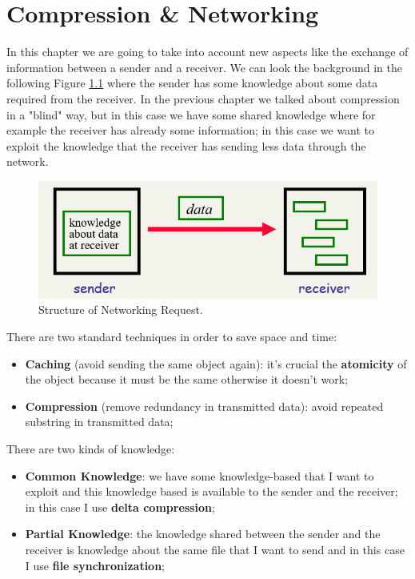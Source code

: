 \chapter{Compression \& Networking}
In this chapter we are going to take into account new aspects like the exchange of information between a sender and a receiver.\newline
We can look the background in the following Figure \ref{fig:networkingrequest} where the sender has some knowledge about some data required from the receiver. In the previous chapter we talked about compression in a "blind" way, but in this case we have some shared knowledge where for example the receiver has already some information; in this case we want to exploit the knowledge that the receiver has sending less data through the network.\newline
\begin{figure}
    \centering
    \includegraphics[width=0.75\linewidth]{images/networking.PNG}
    \caption{Structure of Networking Request.}
    \label{fig:networkingrequest}
\end{figure}
There are two standard techniques in order to save space and time:
\begin{itemize}
    \item \textbf{Caching} (avoid sending the same object again): it's crucial the \textbf{atomicity} of the object because it must be the same otherwise it doesn't work;
    \item \textbf{Compression} (remove redundancy in transmitted data): avoid repeated substring in transmitted data;
\end{itemize}
There are two kinds of knowledge:
\begin{itemize}
    \item \textbf{Common Knowledge}: we have some knowledge-based that I want to exploit and this knowledge based is available to the sender and the receiver; in this case I use \textbf{delta compression};
    \item \textbf{Partial Knowledge}: the knowledge shared between the sender and the receiver is knowledge about the same file that I want to send and in this case I use \textbf{file synchronization};
\end{itemize}
